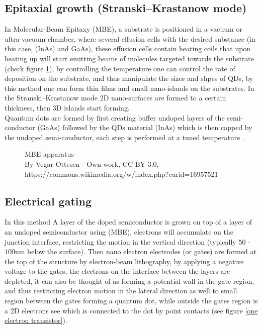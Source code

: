 \documentclass[twoside,11pt]{article}
\begin{document}
    \subsection{Epitaxial growth (Stranski–Krastanow mode)}
    In Molecular-Beam Epitaxy (MBE), a substrate is positioned in a vacuum or ultra-vacuum chamber, where several effusion cells with the desired substance (in this case, (InAs) and GaAs), these effusion cells contain heating coils that upon heating up will start emitting beams of molecules targeted towards the substrate (check figure \ref{MBE apparatus}), by controlling the temperature one can control the rate of deposition on the substrate, and thus manipulate the sizes and shpes of QDs, by this method one can form thin films and small nano-islands on the substrates. In the Stranski–Krastanow mode 2D nano-surfaces are formed to a certain thickness, then 3D islands start forming.\\ Quantum dots are formed by first creating buffer undoped layers of the semi-conductor (GaAs) followed by the QDs material (InAs) which is then capped by the undoped semi-conductor, each step is performed at a tuned temperature \cite{hsu2000tuning}.
    
    
    \begin{figure}[h]
        \centering
        
        \caption{MBE apparatus\\ \small{By Vegar Ottesen - Own work, CC BY 3.0, https://commons.wikimedia.org/w/index.php?curid=16957521}}
        \label{MBE apparatus}
    \end{figure}
        
    \subsection{Electrical gating}
    In this method A layer of the doped semiconductor is grown on top of a layer of an undoped semiconductor using (MBE), electrons will accumulate on the junction interface, restricting the motion in the vertical direction (typically $50$ - $100$nm below the surface). Then nano electron electrodes (or gates) are formed at the top of the structure by electron-beam lithography, by applying a negative voltage to the gates, the electrons on the interface between the layers are depleted, it can also be thought of as forming a potential wall in the gate region, and thus restricting electron motion in the lateral direction as well to small region between the gates forming a quantum dot, while outside the gates region is a 2D electrons see which is connected to the dot by point contacts (see figure \ref{one electron transistor})\cite{alhassid2000statistical}.
    
\end{document}
